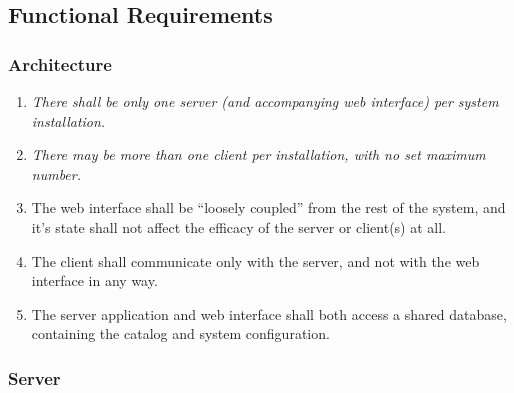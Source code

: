 \subsection{Functional Requirements}

\subsubsection{Architecture}

\begin{enumerate}
    \item \emph{There shall be only one server (and accompanying web interface)
        per system installation.}
    \item \emph{There may be more than one client per installation, with no set
        maximum number.}
    \item The web interface shall be ``loosely coupled'' from the rest of the
        system, and it's state shall not affect the efficacy of the server or
        client(s) at all.
    \item The client shall communicate only with the server, and not with the
        web interface in any way.
    \item The server application and web interface shall both access a shared
        database, containing the catalog and system configuration.
\end{enumerate}

\subsubsection{Server}

